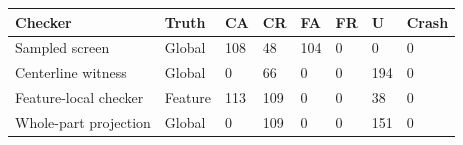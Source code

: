 \begin{tabular}{llllllll}
\toprule
Checker & Truth & CA & CR & FA & FR & U & Crash \\
\midrule
Sampled screen & Global & 108 & 48 & 104 & 0 & 0 & 0 \\
Centerline witness & Global & 0 & 66 & 0 & 0 & 194 & 0 \\
Feature-local checker & Feature & 113 & 109 & 0 & 0 & 38 & 0 \\
Whole-part projection & Global & 0 & 109 & 0 & 0 & 151 & 0 \\
\bottomrule
\end{tabular}
